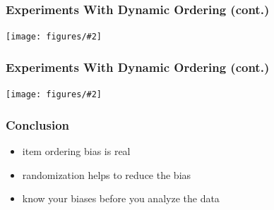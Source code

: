 \documentclass[bigger]{beamer}
\newcommand{\img}[2]{
  \begin{center}
    \texttt{[image: figures/\#2]}
  \end{center}
}
\begin{document}
\begin{frame}
\frametitle{Experiments With Dynamic Ordering (cont.)}
\img{.8}{order-convergence-mean-correlation-b-v2}
\end{frame}

\begin{frame}
\frametitle{Experiments With Dynamic Ordering (cont.)}
  \img{.8}{order-convergence-mean-correlation}
\end{frame}

\begin{frame}
  \frametitle{Conclusion}

  \begin{itemize}
  \item item ordering bias is real
  \item randomization helps to reduce the bias
  \item know your biases before you analyze the data
  \end{itemize}
\end{frame}
\end{document}
